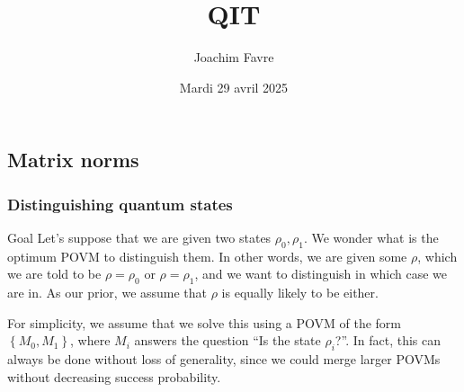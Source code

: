 \documentclass[a4paper]{article}
\title{QIT}
\author{Joachim Favre}
\date{Mardi 29 avril 2025}
\begin{document}
\maketitle


\subsection{Matrix norms}
\subsubsection{Distinguishing quantum states}

\begin{parag}{Goal}
    Let's suppose that we are given two states $\rho_0, \rho_1$. We wonder what is the optimum POVM to distinguish them. In other words, we are given some $\rho$, which we are told to be $\rho = \rho_0$ or $\rho = \rho_1$, and we want to distinguish in which case we are in. As our prior, we assume that $\rho$ is equally likely to be either. 

    For simplicity, we assume that we solve this using a POVM of the form $\left\{M_0, M_1\right\}$, where $M_i$ answers the question ``Is the state $\rho_i$?''. In fact, this can always be done without loss of generality, since we could merge larger POVMs without decreasing success probability.
\end{parag}
\end{document}
